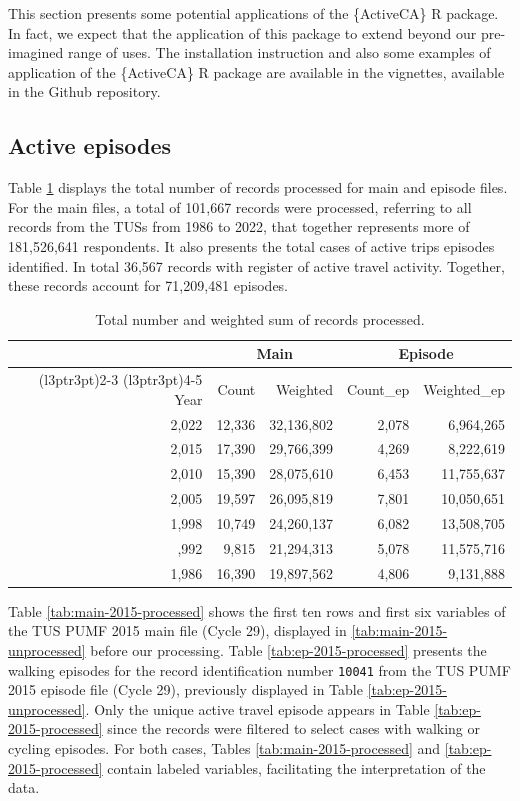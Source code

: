 \documentclass[Royal,times,sageh]{sagej}
\begin{document}
This section presents some potential applications of the \{ActiveCA\} R
package. In fact, we expect that the application of this package to
extend beyond our pre-imagined range of uses. The installation
instruction and also some examples of application of the \{ActiveCA\} R
package are available in the vignettes, available in the Github
repository.

\subsection{Active episodes}\label{active-episodes}

Table \ref{tab:processed-obs} displays the total number of records
processed for main and episode files. For the main files, a total of
101,667 records were processed, referring to all records from the TUSs
from 1986 to 2022, that together represents more of 181,526,641
respondents. It also presents the total cases of active trips episodes
identified. In total 36,567 records with register of active travel
activity. Together, these records account for 71,209,481 episodes.

\begin{table}
\centering
\caption{\label{tab:table_df_processed}\label{tab:processed-obs}Total number and weighted sum of records processed.}
\centering
\fontsize{8}{10}\selectfont
\begin{tabular}[t]{rr>{}r|rr}
\toprule
\multicolumn{1}{c}{ } & \multicolumn{2}{c}{Main} & \multicolumn{2}{c}{Episode} \\
\cmidrule(l{3pt}r{3pt}){2-3} \cmidrule(l{3pt}r{3pt}){4-5}
Year & Count & Weighted & Count\_ep & Weighted\_ep\\
\midrule
2,022 & 12,336 & 32,136,802 & 2,078 & 6,964,265\\
2,015 & 17,390 & 29,766,399 & 4,269 & 8,222,619\\
2,010 & 15,390 & 28,075,610 & 6,453 & 11,755,637\\
2,005 & 19,597 & 26,095,819 & 7,801 & 10,050,651\\
1,998 & 10,749 & 24,260,137 & 6,082 & 13,508,705\\
\addlinespace
1,992 & 9,815 & 21,294,313 & 5,078 & 11,575,716\\
1,986 & 16,390 & 19,897,562 & 4,806 & 9,131,888\\
\bottomrule
\end{tabular}
\end{table}

Table \ref{tab:main-2015-processed} shows the first ten rows and first
six variables of the TUS PUMF 2015 main file (Cycle 29), displayed in
\ref{tab:main-2015-unprocessed} before our processing. Table
\ref{tab:ep-2015-processed} presents the walking episodes for the record
identification number \texttt{10041} from the TUS PUMF 2015 episode file
(Cycle 29), previously displayed in Table \ref{tab:ep-2015-unprocessed}.
Only the unique active travel episode appears in Table
\ref{tab:ep-2015-processed} since the records were filtered to select
cases with walking or cycling episodes. For both cases, Tables
\ref{tab:main-2015-processed} and \ref{tab:ep-2015-processed} contain
labeled variables, facilitating the interpretation of the data.
\end{document}
